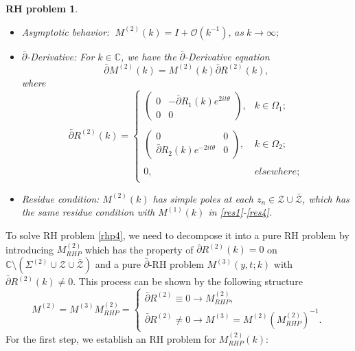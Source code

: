 \documentclass[11pt]{article}
\numberwithin{equation}{section}
\newtheorem{RHP}{RH problem}
\begin{document}
\begin{RHP}
\begin{itemize}
  \item Asymptotic behavior:
  $\ M^{(2)}(k)=I+\mathcal{O}(k^{-1}),\ as \ k\to \infty;$
  \item $\bar{\partial}$-Derivative: For $k\in\mathbb{C}$, we have the $\bar{\partial}$-Derivative equation
\begin{equation}
    \bar{\partial}M^{(2)}(k)=M^{(2)}(k)\bar{\partial}R^{(2)}(k),
\end{equation}
where
  \begin{equation}
\bar{\partial}R^{(2)}(k)=\left\{\begin{array}{lll}
\left(\begin{array}{cc}
0 & -\bar{\partial}R_{1}(k)e^{2it\theta}\\
0 & 0
\end{array}\right), & k\in \Omega_{1};\\
\\
\left(\begin{array}{cc}
0 & 0\\
\bar{\partial}R_{2}(k)e^{-2it\theta} & 0
\end{array}\right),  &k\in \Omega_{2};\\
\\
0,  &elsewhere;\\
\end{array}\right.
\end{equation}
\item Residue condition: $M^{(2)}(k)$ has simple poles at each $z_n\in\mathcal{Z}\cup\bar{\mathcal{Z}}$, which  has the same residue condition with $M^{(1)}(k)$ in \eqref{res1}-\eqref{res4}.

\end{itemize}
\end{RHP}

To solve RH problem \ref{rhp4}, we need to decompose it into a pure RH problem by introducing $M^{(2)}_{RHP}$ which has the property of $\bar{\partial}R^{(2)}(k)=0$ on $\mathbb{C}\setminus(\Sigma^{(2)}\cup\mathcal{Z}\cup\bar{\mathcal{Z}})$ and a pure $\bar{\partial}$-RH problem $M^{(3)}(y,t;k)$ with $\bar{\partial}R^{(2)}(k)\neq0$. This process can be shown by the following structure
\begin{equation}
    M^{(2)} = M^{(3)} M^{(2)}_{RHP}=\begin{cases}
    \bar{\partial} R^{(2)} \equiv 0 \rightarrow M^{(2)}_{RHP}, \\
    \bar{\partial} R^{(2)} \neq 0 \rightarrow M^{(3)} = M^{(2)} \left(M^{(2)}_{RHP}\right)^{-1}.
\end{cases}
\end{equation}
For the first step, we establish an RH problem for $M^{(2)}_{RHP}(k)$:
\end{document}
